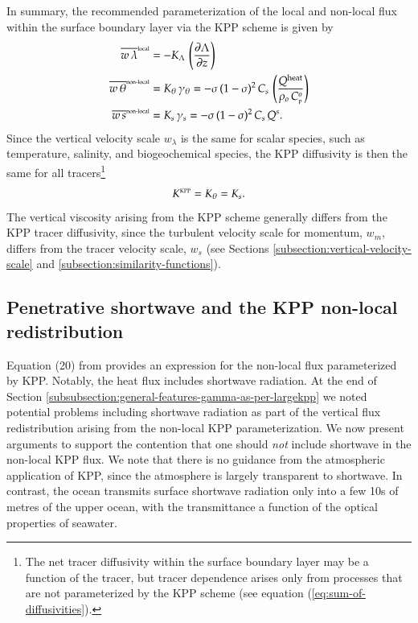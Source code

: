 In summary, the recommended parameterization of the local and
non-local flux within the surface boundary layer via the KPP scheme is
given by
\begin{subequations}
\begin{align}
\overline{w \, \lambda}^{\mbox{\tiny local}} &= -K_{\Lambda}  \, \left( \frac{\partial \Lambda}{\partial z} \right)
 \\
\overline{w \, \theta}^{\mbox{\tiny non-local}} &= K_{\theta}  \, \gamma_{\theta} = 
 - \sigma \, (1-\sigma)^{2} \, C_{s} \, \left( \frac{ Q^{\mbox{\scriptsize heat}}}{ \rho_{o}  \, C_{\mbox{\tiny p}}^{o} } \right)
\label{eq:non-local-flux-kpp-param-temp-simple}
\\
\overline{w \, s}^{\mbox{\tiny non-local}} &= K_{s}  \, \gamma_{s}  = 
 -\sigma \, (1-\sigma)^{2}  \, C_{s} \,  Q^{s}.
\label{eq:non-local-flux-kpp-param-scalar-simple}
\end{align}
\end{subequations}
Since the vertical velocity scale $w_{\lambda}$ is the same for scalar
species, such as temperature, salinity, and biogeochemical species,
the KPP diffusivity is then the same for all tracers\footnote{The net
  tracer diffusivity within the surface boundary layer may be a
  function of the tracer, but tracer dependence arises only from
  processes that are not parameterized by the KPP scheme (see equation
  (\ref{eq:sum-of-diffusivities}).}
\begin{equation}
  K^{\mbox{\tiny KPP}}  = K_{\theta} = K_{s}.
\end{equation} 
The vertical viscosity arising from the KPP scheme generally differs
from the KPP tracer diffusivity, since the turbulent velocity scale
for momentum, $w_{m}$, differs from the tracer velocity scale, $w_{s}$
(see Sections \ref{subsection:vertical-velocity-scale} and
\ref{subsection:similarity-functions}).


\subsection{Penetrative shortwave and the KPP non-local redistribution}
\label{subsection:penetrative-radiation-and-kpp-nonlocal}

Equation (20) from \cite{LargeKPP} provides an expression for the
non-local flux parameterized by KPP.  Notably, the heat flux includes
shortwave radiation.  At the end of Section
\ref{subsubsection:general-features-gamma-as-per-largekpp} we noted
potential problems including shortwave radiation as part of the
vertical flux redistribution arising from the non-local KPP
parameterization.  We now present arguments to support the contention
that one should {\it not} include shortwave in the non-local KPP flux.
We note that there is no guidance from the atmospheric application of
KPP, since the atmosphere is largely transparent to shortwave.  In
contrast, the ocean transmits surface shortwave radiation only into a
few 10s of metres of the upper ocean, with the transmittance a
function of the optical properties of seawater.


